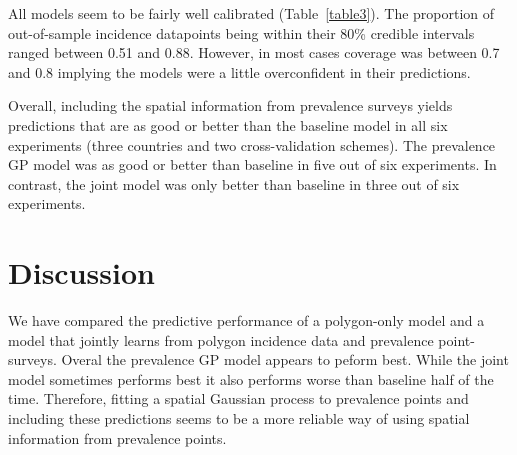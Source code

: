 \documentclass[10pt,letterpaper]{article}
\begin{document}
All models seem to be fairly well calibrated (Table~\ref{table3}).
The proportion of out-of-sample incidence datapoints being within their 80\% credible intervals ranged between 0.51 and 0.88.
However, in most cases coverage was between 0.7 and 0.8 implying the models were a little overconfident in their predictions.



Overall, including the spatial information from prevalence surveys yields predictions that are as good or better than the baseline model in all six experiments (three countries and two cross-validation schemes).
The prevalence GP model was as good or better than baseline in five out of six experiments.
In contrast, the joint model was only better than baseline in three out of six experiments.









\section*{Discussion}



We have compared the predictive performance of a polygon-only model and a model that jointly learns from polygon incidence data and prevalence point-surveys.
Overal the prevalence GP model appears to peform best.
While the joint model sometimes performs best it also performs worse than baseline half of the time.
Therefore, fitting a spatial Gaussian process to prevalence points and including these predictions seems to be a more reliable way of using spatial information from prevalence points.
\end{document}
